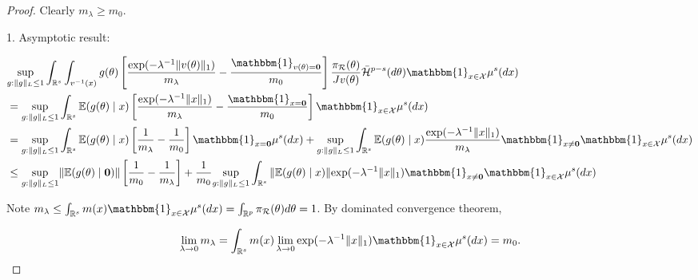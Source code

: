\documentclass[10pt,fleqn]{article}
\newcommand{\mc}[1]{\mathcal{#1}}
\DeclareMathOperator{\1}{\mathbbm{1}}
\begin{document}
\begin{proof}[Proof]
Clearly $m_\lambda \ge m_0$.

1. Asymptotic result:



\begin{equation}                
\label{wass0}
\begin{aligned}
&\underset{g:\|g\|_L\le 1}\sup\int_{\mathbb{R}^{s}}\int_{v^{-1}(x)} g(\theta)  \left[ \frac{ \exp(- \lambda^{-1} \|v(\theta)\|_1) } {  m_\lambda}  - 
\frac{ \mathbbm{1}_{v(\theta)= {\bf 0}} } {  m_0} 
\right]  \frac{\pi_{\mc R}(\theta)}{Jv(\theta)}  \bar{\mc H}^{p-s}(d \theta)\mathbbm{1}_{x\in
\mathcal X}
   \mu^{s}(d x) \\
&= \underset{g:\|g\|_L\le 1}\sup\int_{\mathbb{R}^{s}}  \mathbb{E}(g(\theta) \mid  x)  \left[ \frac{ \exp(- \lambda^{-1} \|x\|_1) } {  m_\lambda}  - 
\frac{ \mathbbm{1}_{x=\bf 0} } {  m_0} 
\right] \mathbbm{1}_{x\in
\mathcal X}\mu^{s}(d x) \\
&=      \underset{g:\|g\|_L\le 1}\sup\int_{\mathbb{R}^{s}}  \mathbb{E}(g(\theta) \mid x)  \left[ \frac{  1} {  m_\lambda}  - 
\frac{ 1 } {  m_0} 
\right]\mathbbm{1}_{x= \bf 0} \mu^{s}(d x)  + \underset{g:\|g\|_L\le 1}\sup\int_{\mathbb{R}^{s}}  \mathbb{E}(g(\theta) \mid x)\frac{ \exp(- \lambda^{-1} \| x\|_1)} {  m_\lambda}  
\mathbbm{1}_{x \neq \bf 0} \mathbbm{1}_{x\in
\mathcal X}\mu^{s}(d x) \\
& \le \underset{g:\|g\|_L\le 1}\sup \|\mathbb{E}(g(\theta) \mid {\bf
0})\| \left[ \frac{ 1 } {  m_0} -\frac{  1} {  m_\lambda}   
\right] + \frac{1} {  m_0} \underset{g:\|g\|_L\le 1}\sup\int_{\mathbb{R}^{s}}  \mathbb{\| E}(g(\theta) \mid x)\|{ \exp(- \lambda^{-1} \| x\|_1)}   
\mathbbm{1}_{x \neq \bf 0} \mathbbm{1}_{x\in
\mathcal X}\mu^{s}(d x) \\      
\end{aligned}
\end{equation}


Note $m_\lambda\le  \int_{\mathbb{R}^{s}}  m(x)\mathbbm{1}_{x\in
\mathcal X}\mu^{s}(d x) =\int_{\mathbb{R}^{p}} \pi_{\mc R}(\theta)d \theta =1$. By dominated convergence theorem, 

\begin{equation}
\lim_{\lambda\rightarrow 0}m_\lambda=  \int_{\mathbb{R}^{s}}  m(x)\lim_{\lambda\rightarrow 0}\exp(- \lambda^{-1} \| x\|_1 )  \mathbbm{1}_{x\in
\mathcal X}\mu^{s}(d x)   = m_0.
\end{equation}



\end{proof}
\end{document}
